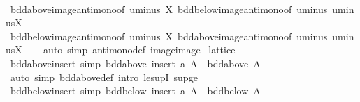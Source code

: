 \begin{isabellebody}
%
\isadelimproof
\ \ %
\endisadelimproof
%
\isatagproof
{}\isamarkupfalse%
\ bdd{\isacharunderscore}{\kern0pt}above{\isacharunderscore}{\kern0pt}image{\isacharunderscore}{\kern0pt}antimono{\isacharbrackleft}{\kern0pt}of\ uminus\ X{\isacharbrackright}{\kern0pt}\ bdd{\isacharunderscore}{\kern0pt}below{\isacharunderscore}{\kern0pt}image{\isacharunderscore}{\kern0pt}antimono{\isacharbrackleft}{\kern0pt}of\ uminus\ {\isachardoublequoteopen}uminus{\isacharbackquote}{\kern0pt}X{\isachardoublequoteclose}{\isacharbrackright}{\kern0pt}\isanewline
\ \ \isamarkupfalse%
\ bdd{\isacharunderscore}{\kern0pt}below{\isacharunderscore}{\kern0pt}image{\isacharunderscore}{\kern0pt}antimono{\isacharbrackleft}{\kern0pt}of\ uminus\ X{\isacharbrackright}{\kern0pt}\ bdd{\isacharunderscore}{\kern0pt}above{\isacharunderscore}{\kern0pt}image{\isacharunderscore}{\kern0pt}antimono{\isacharbrackleft}{\kern0pt}of\ uminus\ {\isachardoublequoteopen}uminus{\isacharbackquote}{\kern0pt}X{\isachardoublequoteclose}{\isacharbrackright}{\kern0pt}\isanewline
\ \ \isamarkupfalse%
\ {\isacharparenleft}{\kern0pt}auto\ simp{\isacharcolon}{\kern0pt}\ antimono{\isacharunderscore}{\kern0pt}def\ image{\isacharunderscore}{\kern0pt}image{\isacharparenright}{\kern0pt}%
\endisatagproof
{\isafoldproof}%
%
\isadelimproof
\isanewline
%
\endisadelimproof
\isanewline
{}\isamarkupfalse%
\ lattice\isanewline
{}\isanewline
\isanewline
{}\isamarkupfalse%
\ bdd{\isacharunderscore}{\kern0pt}above{\isacharunderscore}{\kern0pt}insert\ {\isacharbrackleft}{\kern0pt}simp{\isacharbrackright}{\kern0pt}{\isacharcolon}{\kern0pt}\ {\isachardoublequoteopen}bdd{\isacharunderscore}{\kern0pt}above\ {\isacharparenleft}{\kern0pt}insert\ a\ A{\isacharparenright}{\kern0pt}\ {\isacharequal}{\kern0pt}\ bdd{\isacharunderscore}{\kern0pt}above\ A{\isachardoublequoteclose}\isanewline
%
\isadelimproof
\ \ %
\endisadelimproof
%
\isatagproof
{}\isamarkupfalse%
\ {\isacharparenleft}{\kern0pt}auto\ simp{\isacharcolon}{\kern0pt}\ bdd{\isacharunderscore}{\kern0pt}above{\isacharunderscore}{\kern0pt}def\ intro{\isacharcolon}{\kern0pt}\ le{\isacharunderscore}{\kern0pt}supI{}\ sup{\isacharunderscore}{\kern0pt}ge{}{\isacharparenright}{\kern0pt}%
\endisatagproof
{\isafoldproof}%
%
\isadelimproof
\isanewline
%
\endisadelimproof
\isanewline
{}\isamarkupfalse%
\ bdd{\isacharunderscore}{\kern0pt}below{\isacharunderscore}{\kern0pt}insert\ {\isacharbrackleft}{\kern0pt}simp{\isacharbrackright}{\kern0pt}{\isacharcolon}{\kern0pt}\ {\isachardoublequoteopen}bdd{\isacharunderscore}{\kern0pt}below\ {\isacharparenleft}{\kern0pt}insert\ a\ A{\isacharparenright}{\kern0pt}\ {\isacharequal}{\kern0pt}\ bdd{\isacharunderscore}{\kern0pt}below\ A{\isachardoublequoteclose}\isanewline

\end{isabellebody}
